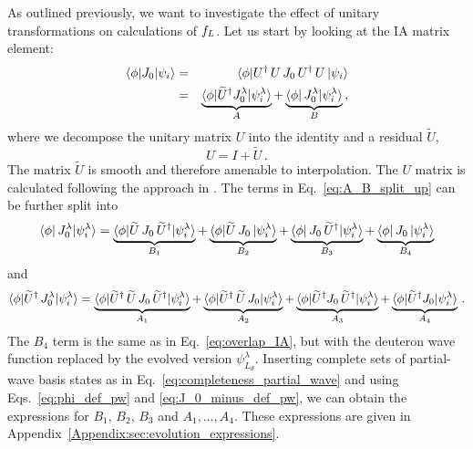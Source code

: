 	As outlined previously, we want to investigate the effect of
	unitary transformations on calculations of $f_L$.
	Let us start by looking at the IA matrix element:
	\begin{eqnarray}
	 \langle \phi | J_0 | \psi_i \rangle
	 &=& \langle \phi | U^\dag \, U \, J_0 \, U^\dag \, U \, | \psi_i \rangle \nonumber \\
	 &=& \underbrace{\langle\phi|\widetilde{U}^\dag J_0^\lambda|\psi_i^\lambda\rangle}_{A}
	 + \underbrace{\langle \phi | \, J_0^\lambda | \psi_i^\lambda \rangle}_{B} \,,
	\label{eq:A_B_split_up}
	\end{eqnarray}
	where we decompose the unitary matrix $U$ into the identity and a residual
	$\widetilde{U}$,
	\begin{equation}
	 U = I + \widetilde{U} \,.
	\label{eq:U_decomposition}
	\end{equation}
	The matrix $\widetilde{U}$ is smooth and therefore amenable to interpolation.
	The $U$ matrix is calculated following the approach in \cite{Anderson:2010aq}.
	The terms in Eq.~\eqref{eq:A_B_split_up} can be further split into
	\begin{equation}
	 \langle \phi | \, J_0^\lambda | \psi_i^\lambda \rangle
	 = \underbrace{\langle \phi | \widetilde{U}\, J_0 \, \widetilde{U}^\dag |
	  \psi_i^\lambda \rangle}_{B_1}
	 + \underbrace{\langle \phi | \widetilde{U}\, J_0 \, | \psi_i^\lambda \rangle}_{B_2}
	 + \underbrace{\langle \phi | \, J_0 \, \widetilde{U}^\dag | \psi_i^\lambda
	  \rangle}_{B_3}
	 + \underbrace{\langle \phi |\, J_0 \, | \psi_i^\lambda \rangle}_{B_4}
	\label{eq:B_split_up}
  \end{equation}
 	and
 	\begin{equation}
	 \langle \phi | \widetilde{U}^\dag \, J_0^\lambda | \psi_i^\lambda \rangle \\[0.25em]
	 = \underbrace{\langle \phi | \widetilde{U}^\dag \, \widetilde{U}\, J_0 \,
	  \widetilde{U}^\dag | \psi_i^\lambda \rangle}_{A_1}
	 + \underbrace{\langle \phi | \widetilde{U}^\dag \, \widetilde{U}\, J_0 |
	  \psi_i^\lambda \rangle}_{A_2}
	 + \underbrace{\langle \phi | \widetilde{U}^\dag J_0 \,
	  \widetilde{U}^\dag | \psi_i^\lambda \rangle}_{A_3}
	 + \underbrace{\langle\phi | \widetilde{U}^\dag J_0 | \psi_i^\lambda\rangle}_{A_4} \,.
	\label{eq:A_split_up}
 	\end{equation}
	The $B_4$ term is the same as in Eq.~\eqref{eq:overlap_IA}, but with the
	deuteron wave function replaced by the evolved version $\psi_{L_d}^\lambda$.
	Inserting complete sets of partial-wave basis states as in
	Eq.~\eqref{eq:completeness_partial_wave} and using Eqs.~\eqref{eq:phi_def_pw}
	and \eqref{eq:J_0_minus_def_pw}, we can obtain the expressions for $B_1$,
	$B_2$, $B_3$ and $A_1,\ldots,A_4$.  These expressions are given in
	Appendix~\ref{Appendix:sec:evolution_expressions}.

